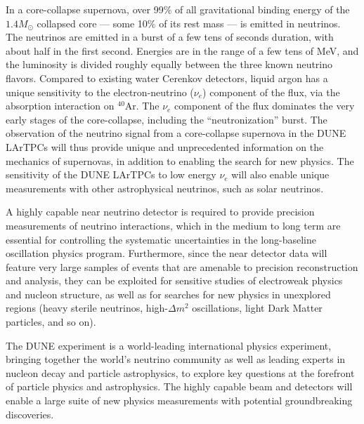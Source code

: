 In a core-collapse supernova, over 99\% of all gravitational binding
energy of the $1.4 M_{\odot}$ collapsed core --- some 10\% of its rest
mass --- is emitted in neutrinos.  The neutrinos are emitted in a burst
of a few tens of seconds duration, with about half in the first
second. Energies are in the range of a few tens of MeV, and the
luminosity is divided roughly equally between the three known neutrino
flavors.  Compared to existing water Cerenkov detectors, liquid argon
has a unique sensitivity to the electron-neutrino ($\nu_e$) component
of the flux, via the absorption interaction on $^{40}$Ar. The $\nu_e$
component of the flux dominates the very early stages of the
core-collapse, including the ``neutronization'' burst. The observation
of the neutrino signal from a core-collapse supernova in the DUNE
LArTPCs will thus provide unique and unprecedented information on the
mechanics of supernovas, in addition to enabling the search for new
physics. The sensitivity of the DUNE LArTPCs to low energy $\nu_e$
will also enable unique measurements with other astrophysical
neutrinos, such as solar neutrinos.

A highly capable near neutrino detector is required to provide
precision measurements of neutrino interactions, which in the medium
to long term are essential for controlling the systematic
uncertainties in the long-baseline oscillation physics
program. Furthermore, since the near detector data will feature very
large samples of events that are amenable to precision reconstruction
and analysis, they can be exploited for sensitive studies of
electroweak physics and nucleon structure, as well as for searches for
new physics in unexplored regions (heavy sterile neutrinos,
high-$\Delta m^2$ oscillations, light Dark Matter particles, and so
on).

The DUNE experiment is a world-leading international physics
experiment, bringing together the world's neutrino community as well
as leading experts in nucleon decay and particle astrophysics, to
explore key questions at the forefront of particle physics and
astrophysics. The highly capable beam and detectors will enable a
large suite of new physics measurements with potential groundbreaking
discoveries.
